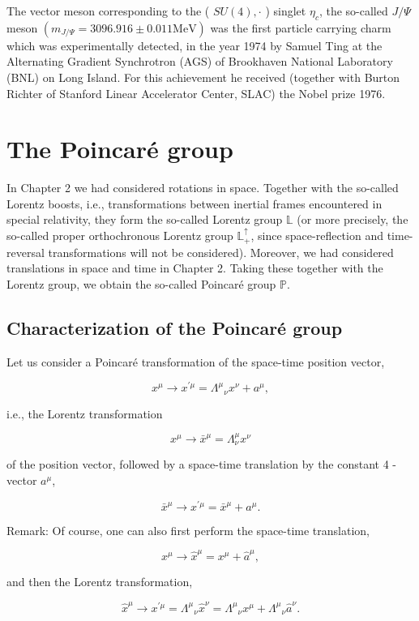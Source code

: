 \documentclass[10pt, letterpaper]{article}
\begin{document}
The vector meson corresponding to the ( $S U(4), \cdot$ ) singlet $\eta_{c}$, the so-called $J / \Psi$ meson $\left(m_{J / \Psi}=3096.916 \pm 0.011 \mathrm{MeV}\right)$ was the first particle carrying charm which was experimentally detected, in the year 1974 by Samuel Ting at the Alternating Gradient Synchrotron (AGS) of Brookhaven National Laboratory (BNL) on Long Island. For this achievement he received (together with Burton Richter of Stanford Linear Accelerator Center, SLAC) the Nobel prize 1976.

\section{The Poincaré group}
In Chapter 2 we had considered rotations in space. Together with the so-called Lorentz boosts, i.e., transformations between inertial frames encountered in special relativity, they form the so-called Lorentz group $\mathbb{L}$ (or more precisely, the so-called proper orthochronous Lorentz group $\mathbb{L}_{+}^{\uparrow}$, since space-reflection and time-reversal transformations will not be considered). Moreover, we had considered translations in space and time in Chapter 2. Taking these together with the Lorentz group, we obtain the so-called Poincaré group $\mathbb{P}$.

\subsection{Characterization of the Poincaré group}
Let us consider a Poincaré transformation of the space-time position vector,

$$
x^{\mu} \longrightarrow x^{\prime \mu}=\Lambda^{\mu}{ }_{\nu} x^{\nu}+a^{\mu},
$$

i.e., the Lorentz transformation

$$
x^{\mu} \longrightarrow \bar{x}^{\mu}=\Lambda_{\nu}^{\mu} x^{\nu}
$$

of the position vector, followed by a space-time translation by the constant 4 -vector $a^{\mu}$,

$$
\bar{x}^{\mu} \longrightarrow x^{\prime \mu}=\bar{x}^{\mu}+a^{\mu} .
$$

Remark: Of course, one can also first perform the space-time translation,

$$
x^{\mu} \longrightarrow \hat{x}^{\mu}=x^{\mu}+\hat{a}^{\mu},
$$

and then the Lorentz transformation,

$$
\hat{x}^{\mu} \longrightarrow x^{\prime \mu}=\Lambda^{\mu}{ }_{\nu} \hat{x}^{\nu}=\Lambda^{\mu}{ }_{\nu} x^{\mu}+\Lambda^{\mu}{ }_{\nu} \hat{a}^{\nu} .
$$
\end{document}
